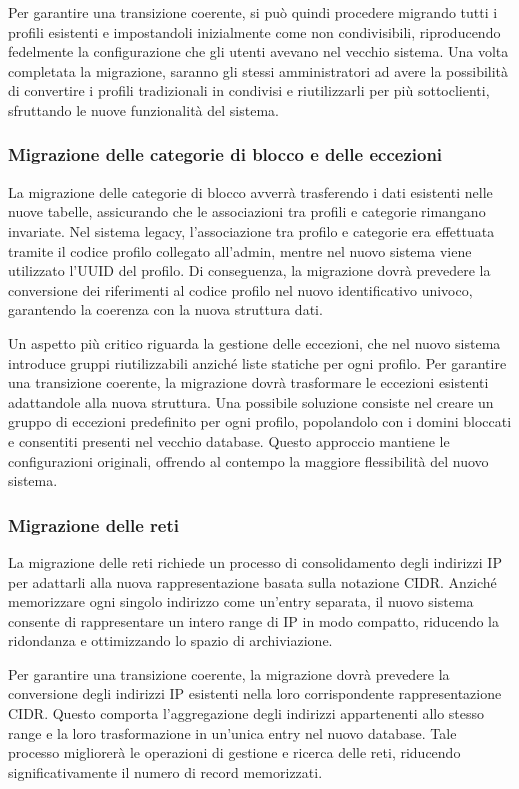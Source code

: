 Per garantire una transizione coerente, si può quindi procedere migrando tutti i profili esistenti e impostandoli inizialmente come non condivisibili, riproducendo fedelmente la configurazione che gli utenti avevano nel vecchio sistema. Una volta completata la migrazione, saranno gli stessi amministratori ad avere la possibilità di convertire i profili tradizionali in condivisi e riutilizzarli per più sottoclienti, sfruttando le nuove funzionalità del sistema.

\subsubsection{Migrazione delle categorie di blocco e delle eccezioni}
La migrazione delle categorie di blocco avverrà trasferendo i dati esistenti nelle nuove tabelle, assicurando che le associazioni tra profili e categorie rimangano invariate. Nel sistema legacy, l'associazione tra profilo e categorie era effettuata tramite il codice profilo collegato all'admin, mentre nel nuovo sistema viene utilizzato l'UUID del profilo. Di conseguenza, la migrazione dovrà prevedere la conversione dei riferimenti al codice profilo nel nuovo identificativo univoco, garantendo la coerenza con la nuova struttura dati.

Un aspetto più critico riguarda la gestione delle eccezioni, che nel nuovo sistema introduce gruppi riutilizzabili anziché liste statiche per ogni profilo. Per garantire una transizione coerente, la migrazione dovrà trasformare le eccezioni esistenti adattandole alla nuova struttura. Una possibile soluzione consiste nel creare un gruppo di eccezioni predefinito per ogni profilo, popolandolo con i domini bloccati e consentiti presenti nel vecchio database. Questo approccio mantiene le configurazioni originali, offrendo al contempo la maggiore flessibilità del nuovo sistema.

\subsubsection{Migrazione delle reti}
La migrazione delle reti richiede un processo di consolidamento degli indirizzi IP per adattarli alla nuova rappresentazione basata sulla notazione CIDR. Anziché memorizzare ogni singolo indirizzo come un’entry separata, il nuovo sistema consente di rappresentare un intero range di IP in modo compatto, riducendo la ridondanza e ottimizzando lo spazio di archiviazione.

Per garantire una transizione coerente, la migrazione dovrà prevedere la conversione degli indirizzi IP esistenti nella loro corrispondente rappresentazione CIDR. Questo comporta l’aggregazione degli indirizzi appartenenti allo stesso range e la loro trasformazione in un’unica entry nel nuovo database. Tale processo migliorerà le operazioni di gestione e ricerca delle reti, riducendo significativamente il numero di record memorizzati.

